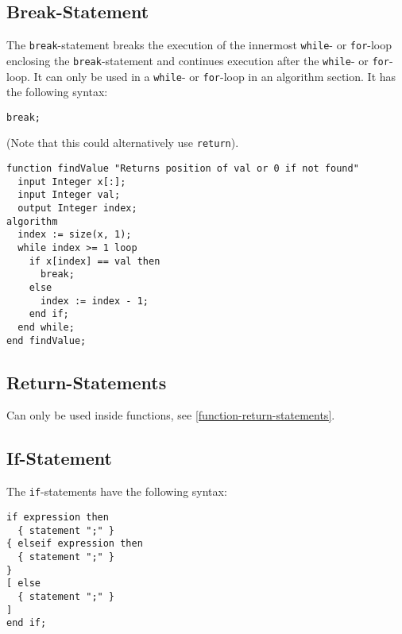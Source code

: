 \subsection{Break-Statement}\label{break-statement}

The \lstinline!break!-statement breaks the execution of the innermost \lstinline!while!- or \lstinline!for!-loop enclosing the \lstinline!break!-statement and continues execution after the \lstinline!while!- or \lstinline!for!-loop.
It can only be used in a \lstinline!while!- or \lstinline!for!-loop in an algorithm section.
It has the following syntax:
\begin{lstlisting}[language=modelica]
break;
\end{lstlisting}

\begin{example}
(Note that this could alternatively use \lstinline!return!).
\begin{lstlisting}[language=modelica]
function findValue "Returns position of val or 0 if not found"
  input Integer x[:];
  input Integer val;
  output Integer index;
algorithm
  index := size(x, 1);
  while index >= 1 loop
    if x[index] == val then
      break;
    else
      index := index - 1;
    end if;
  end while;
end findValue;
\end{lstlisting}
\end{example}

\subsection{Return-Statements}\label{return-statements}

Can only be used inside functions, see \cref{function-return-statements}.

\subsection{If-Statement}\label{if-statement}

The \lstinline!if!-statements have the following syntax:
\begin{lstlisting}[language=grammar]
if expression then
  { statement ";" }
{ elseif expression then
  { statement ";" }
}
[ else
  { statement ";" }
]
end if;
\end{lstlisting}

